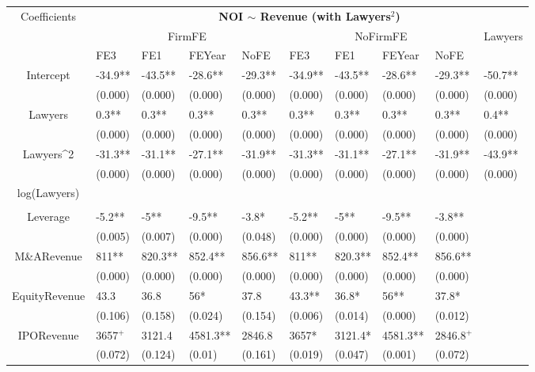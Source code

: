 \documentclass{article}
\begin{document}
\begin{table}[H]
\centering
\begin{tabular}{|clllllllll|}
\hline
\multirow{3}{*}{Coefficients} & \multicolumn{9}{c|}{\textbf{NOI $\sim$ Revenue (with Lawyers$^2$)}} \\
\cline{2-10}
& \multicolumn{4}{c}{FirmFE} & \multicolumn{4}{c}{NoFirmFE} & \multirow{2}{*}{Lawyers} \\
\cline{2-9}
& FE3 & FE1 & FEYear & NoFE & FE3 & FE1 & FEYear & NoFE &  \\
\hline
 
Intercept & -34.9** & -43.5** & -28.6** & -29.3** & -34.9** & -43.5** & -28.6** & -29.3** & -50.7** \\ 
   & (0.000) & (0.000) & (0.000) & (0.000) & (0.000) & (0.000) & (0.000) & (0.000) & (0.000) \\ 
  Lawyers & 0.3** & 0.3** & 0.3** & 0.3** & 0.3** & 0.3** & 0.3** & 0.3** & 0.4** \\ 
   & (0.000) & (0.000) & (0.000) & (0.000) & (0.000) & (0.000) & (0.000) & (0.000) & (0.000) \\ 
  Lawyers^2 & -31.3** & -31.1** & -27.1** & -31.9** & -31.3** & -31.1** & -27.1** & -31.9** & -43.9** \\ 
   & (0.000) & (0.000) & (0.000) & (0.000) & (0.000) & (0.000) & (0.000) & (0.000) & (0.000) \\ 
  log(Lawyers) &  &  &  &  &  &  &  &  &  \\ 
   &  &  &  &  &  &  &  &  &  \\ 
  Leverage & -5.2** & -5** & -9.5** & -3.8* & -5.2** & -5** & -9.5** & -3.8** &  \\ 
   & (0.005) & (0.007) & (0.000) & (0.048) & (0.000) & (0.000) & (0.000) & (0.000) &  \\ 
  M\&ARevenue & 811** & 820.3** & 852.4** & 856.6** & 811** & 820.3** & 852.4** & 856.6** &  \\ 
   & (0.000) & (0.000) & (0.000) & (0.000) & (0.000) & (0.000) & (0.000) & (0.000) &  \\ 
  EquityRevenue & 43.3 & 36.8 & 56* & 37.8 & 43.3** & 36.8* & 56** & 37.8* &  \\ 
   & (0.106) & (0.158) & (0.024) & (0.154) & (0.006) & (0.014) & (0.000) & (0.012) &  \\ 
  IPORevenue & 3657$^{+}$ & 3121.4 & 4581.3** & 2846.8 & 3657* & 3121.4* & 4581.3** & 2846.8$^{+}$ &  \\ 
   & (0.072) & (0.124) & (0.01) & (0.161) & (0.019) & (0.047) & (0.001) & (0.072) &  \\ 

\end{tabular}
\end{table}
\end{document}
